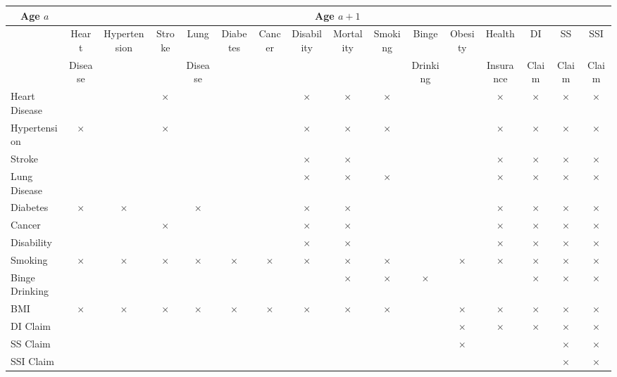 \begin{tabular}{l|ccccccccccccccc} \toprule
\multicolumn{1}{c}{Age $a$} & \multicolumn{15}{c}{Age $a+1$} \\ \midrule
  & Heart & Hypertension & Stroke & Lung  & Diabetes & Cancer & Disability & Mortality & Smoking & Binge & Obesity & Health  & DI  & SS  & SSI  \\
&  Disease &  &  & Disease & & & & &  &Drinking&  & Insurance & Claim & Claim & Claim \\
Heart Disease & & & $\times$& & & &$\times$ &$\times$ & $\times$ &          &       &  $\times$  & $\times$ & $\times$ & $\times$\\
Hypertension  &  $\times$& & $\times$ & & & &$\times$ &$\times$ & $\times$ &      &     & $\times$   & $\times$ & $\times$  & $\times$\\
Stroke           & & & & & & &$\times$ &$\times$ &  &            &      &   $\times$  & $\times$ & $\times$  & $\times$\\
Lung Disease & & & & & & &$\times$ &$\times$ & $\times$&          &        &   $\times$  &$\times$  & $\times$  & $\times$\\
Diabetes       & $\times$ &$\times$  & &  $\times$ & & &$\times$ &$\times$ & &           &       &  $\times$    & $\times$& $\times$ & $\times$ \\
Cancer         & & & $\times$ &  & &   &$\times$ & $\times$&  &           &         &   $\times$  & $\times$ & $\times$  & $\times$\\
Disability     & & & & & & &$\times$ &$\times$ & &         &      &     $\times$  & $\times$ & $\times$   & $\times$\\
\midrule
Smoking & $\times$& $\times$&$\times$ & $\times$& $\times$& $\times$&$\times$ &$\times$ & $\times$ &  &  $\times$ &     $\times$  & $\times$ & $\times$   & $\times$\\
Binge Drinking & & & & & & &  &$\times$ & $\times$  &        $\times$  &      &      & $\times$ & $\times$   & $\times$\\
BMI & $\times$& $\times$&$\times$ & $\times$& $\times$& $\times$&$\times$ &$\times$ & $\times$ &   &  $\times$ &     $\times$  & $\times$ & $\times$   & $\times$\\
\midrule
DI Claim      & & & & &  & & & & &            &    $\times$     & $\times$    & $\times$   & $\times$ & $\times$\\
SS Claim     & & & & & & & & &           &         &    $\times$  & &  & $\times$& $\times$\\
SSI Claim   & & & & &&  & & & &         &        &      & & $\times$  & $\times$\\ \bottomrule
\end{tabular}
